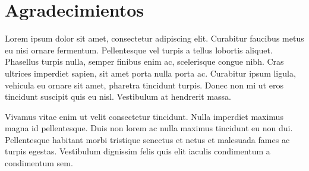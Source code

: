 \chapter*{Agradecimientos}

Lorem ipsum dolor sit amet, consectetur adipiscing elit. Curabitur faucibus metus eu nisi ornare fermentum. Pellentesque vel turpis a tellus lobortis aliquet. Phasellus turpis nulla, semper finibus enim ac, scelerisque congue nibh. Cras ultrices imperdiet sapien, sit amet porta nulla porta ac. Curabitur ipsum ligula, vehicula eu ornare sit amet, pharetra tincidunt turpis. Donec non mi ut eros tincidunt suscipit quis eu nisl. Vestibulum at hendrerit massa.

Vivamus vitae enim ut velit consectetur tincidunt. Nulla imperdiet maximus magna id pellentesque. Duis non lorem ac nulla maximus tincidunt eu non dui. Pellentesque habitant morbi tristique senectus et netus et malesuada fames ac turpis egestas. Vestibulum dignissim felis quis elit iaculis condimentum a condimentum sem.
